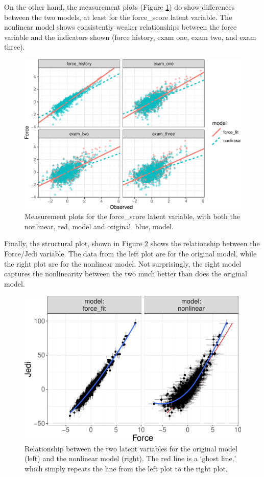 \documentclass[
  english,
  doc]{apa6}
\begin{document}
On the other hand, the measurement plots (Figure \ref{fig:measnl}) do show differences between the two models, at least for the force\_score latent variable. The nonlinear model shows consistently weaker relationships between the force variable and the indicators shown (force history, exam one, exam two, and exam three).

\begin{figure}
\centering
\includegraphics{flexplavaan_draft_files/figure-latex/measnl-1.pdf}
\caption{\label{fig:measnl}Measurement plots for the force\_score latent variable, with both the nonlinear, red, model and original, blue, model.}
\end{figure}

Finally, the structural plot, shown in Figure \ref{fig:structureNonlin} shows the relationship between the Force/Jedi variable. The data from the left plot are for the original model, while the right plot are for the nonlinear model. Not surprisingly, the right model captures the nonlinearity between the two much better than does the original model.

\begin{figure}
\centering
\includegraphics{flexplavaan_draft_files/figure-latex/structureNonlin-1.pdf}
\caption{\label{fig:structureNonlin}Relationship between the two latent variables for the original model (left) and the nonlinear model (right). The red line is a `ghost line,' which simply repeats the line from the left plot to the right plot.}
\end{figure}
\end{document}
